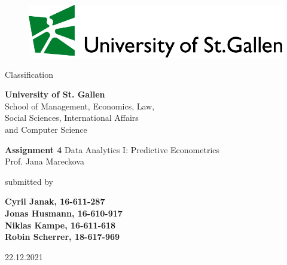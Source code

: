 \begin{center}
\begin{figure}[htb]
  \centering
  \def\svgwidth{450pt}
  \scriptsize{\includegraphics[width=15cm]{rmarkdown/logo-hsg-neu-en.pdf}}
\end{figure}
\end{center}

\medskip
\begin{center}
  \huge{Classification}
\end{center}

\medskip
\begin{center}
  \normalsize{\textbf{University of St. Gallen}\\
              School of Management, Economics, Law,\\
              Social Sciences, International Affairs \\
              and Computer Science}
\end{center}

\medskip
\begin{center}
\textbf{\Large{Assignment 4}}
\linebreak
\linebreak
\normalsize{Data Analytics I: Predictive Econometrics\\
            Prof. Jana Mareckova}
\end{center}
\medskip
\begin{center}
  submitted by
\end{center}
\medskip
\begin{center}
  \Large{\textbf{Cyril Janak, 16-611-287}}\\
  \Large{\textbf{Jonas Husmann, 16-610-917}}\\
  \Large{\textbf{Niklas Kampe, 16-611-618}}\\
  \Large{\textbf{Robin Scherrer, 18-617-969}}
\end{center}

\vspace*{\fill}
\begin{center}
\large{22.12.2021}
\end{center}